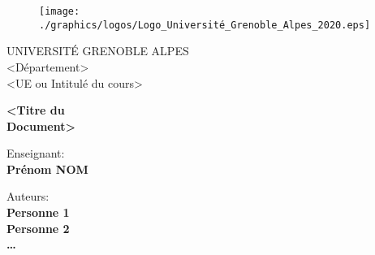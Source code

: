 \documentclass[a4paper, twoside]{report}
\begin{document}





\begin{titlepage}
\begin{figure}[!htb]
    \centering
    \texttt{[image: ./graphics/logos/Logo\_Université\_Grenoble\_Alpes\_2020.eps]}
\end{figure}

\begin{center}
    \LARGE{UNIVERSITÉ GRENOBLE ALPES}
    \vspace{5mm}
    \\ \large{<Département>}
    \vspace{5mm}
    \\ \LARGE{<UE ou Intitulé du cours>}
\end{center}

\vspace{15mm}
\begin{center}
    {\LARGE{\bf <Titre du\\\vspace{5mm}Document>}}
\end{center}
\vspace{30mm}

\begin{minipage}[t]{0.47\textwidth}
	{\large{Enseignant:}{\normalsize\vspace{3mm}
	\bf\\ \large{Prénom NOM \vspace{2mm}\\ }}}
\end{minipage}
\hfill
\begin{minipage}[t]{0.47\textwidth}\raggedleft
	{\large{Auteurs:}{\normalsize\vspace{3mm}
    \bf\\ \large{Personne 1 \vspace{2mm}\\ Personne 2 \vspace{2mm}\\\ldots }}}
\end{minipage}

\vspace{30mm}
\hrulefill
\\
\\\vspace{2em}

\end{titlepage}
\end{document}
